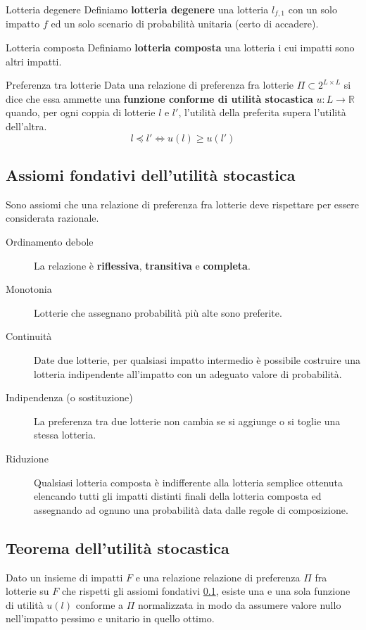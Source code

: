 \documentclass[\main/main.tex]{subfiles}
\begin{document}
\begin{definition}{Lotteria degenere}
  Definiamo \textbf{lotteria degenere} una lotteria $l_{f,1}$ con un solo impatto $f$ ed un solo scenario di probabilità unitaria (certo di accadere).
\end{definition}

\begin{definition}{Lotteria composta}
  Definiamo \textbf{lotteria composta} una lotteria i cui impatti sono altri impatti.
\end{definition}

\begin{definition}{Preferenza tra lotterie}
  Data una relazione di preferenza fra lotterie $\Pi \subset 2^{L \times L}$ si dice che essa ammette una \textbf{funzione conforme di utilità stocastica} $u: L \rightarrow \mathbb{R}$ quando, per ogni coppia di lotterie $l$ e $l'$, l'utilità della preferita supera l'utilità dell'altra.
  \[
    l \preceq l' \Leftrightarrow u(l) \geq u(l')
  \]
\end{definition}

\subsection{Assiomi fondativi dell'utilità stocastica} \label{assiomi_fondativi}
Sono assiomi che una relazione di preferenza fra lotterie deve rispettare per essere considerata razionale.

\begin{description}
  \item[Ordinamento debole] La relazione è \textbf{riflessiva}, \textbf{transitiva} e \textbf{completa}.
  \item[Monotonia] Lotterie che assegnano probabilità più alte sono preferite.
  \item[Continuità] Date due lotterie, per qualsiasi impatto intermedio è possibile costruire una lotteria indipendente all'impatto con un adeguato valore di probabilità.
  \item[Indipendenza (o sostituzione)] La preferenza tra due lotterie non cambia se si aggiunge o si toglie una stessa lotteria.
  \item[Riduzione] Qualsiasi lotteria composta è indifferente alla lotteria semplice ottenuta elencando tutti gli impatti distinti finali della lotteria composta ed assegnando ad ognuno una probabilità data dalle regole di composizione.
\end{description}

\subsection{Teorema dell'utilità stocastica}
\begin{theorem}
  Dato un insieme di impatti $F$ e una relazione relazione di preferenza $\Pi$ fra lotterie su $F$ che rispetti gli assiomi fondativi \ref{assiomi_fondativi}, esiste una e una sola funzione di utilità $u(l)$ conforme a $\Pi$ normalizzata in modo da assumere valore nullo nell'impatto pessimo e unitario in quello ottimo.
\end{theorem}
\end{document}
